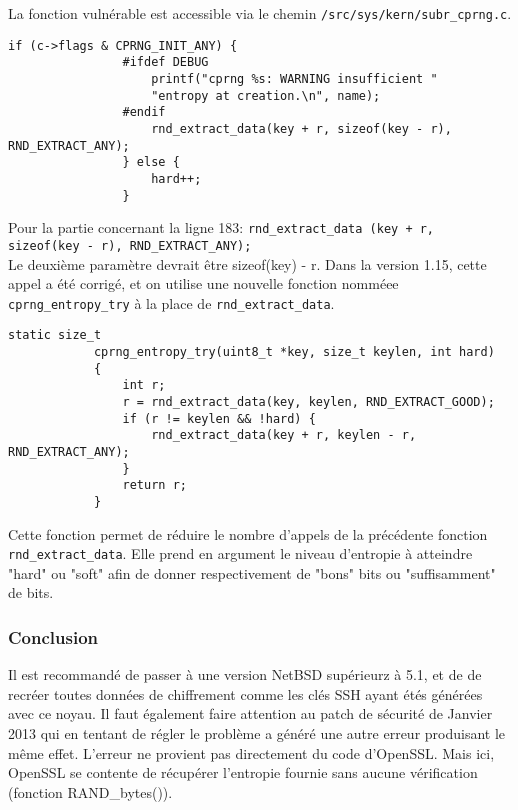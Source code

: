 			La fonction vulnérable est accessible via le chemin
			\texttt{/src/sys/kern/subr\_cprng.c}.
			
			\begin{lstlisting}[style=customc,caption=subr\_cprng.c(1),
			 label=subrcprng1]
				if (c->flags & CPRNG_INIT_ANY) {
				#ifdef DEBUG
					printf("cprng %s: WARNING insufficient "
					"entropy at creation.\n", name);
				#endif
					rnd_extract_data(key + r, sizeof(key - r), RND_EXTRACT_ANY);
				} else {
					hard++;
				}
			\end{lstlisting}
			
			Pour la partie concernant la ligne 183: \texttt{rnd\_extract\_data
			(key + r, sizeof(key - r), RND\_EXTRACT\_ANY);}\\
			Le deuxième paramètre devrait être sizeof(key) - r.			
			Dans la version 1.15, cette appel a été corrigé,
			et on utilise une nouvelle fonction nomméee
			\texttt{cprng\_entropy\_try} \cite{diffNetBSD} à la place de 
			\texttt{rnd\_extract\_data}.
			
			\begin{lstlisting}[style=customc,caption=subr\_cprng.c(2),
			 label=subrcprng2]
			static size_t
 	 		cprng_entropy_try(uint8_t *key, size_t keylen, int hard)
 	 		{
 	        	int r;
 	         	r = rnd_extract_data(key, keylen, RND_EXTRACT_GOOD);
 	         	if (r != keylen && !hard) {
 	            	rnd_extract_data(key + r, keylen - r, RND_EXTRACT_ANY);
 	         	}
 	    		return r;
 	    	}
			\end{lstlisting}

			Cette fonction permet de réduire le nombre d'appels de la
			précédente fonction \texttt{rnd\_extract\_data}.
			Elle prend en argument le niveau d'entropie à atteindre "hard"
			ou "soft" afin de donner respectivement de "bons" bits ou
			"suffisamment" de bits.
			

		\subsubsection{Conclusion}
			
			Il est recommandé de passer à une version NetBSD supérieurz à 5.1, et
			de de recréer toutes données de chiffrement comme les clés SSH
			ayant étés générées avec ce noyau. Il faut également faire attention au patch de sécurité de Janvier 2013
			qui en tentant de régler le problème a généré une autre erreur produisant
			le même effet.	L'erreur ne provient pas directement du code d'OpenSSL.
			Mais ici, OpenSSL se contente de récupérer l'entropie fournie
			sans aucune vérification (fonction RAND\_bytes()).\\
			
